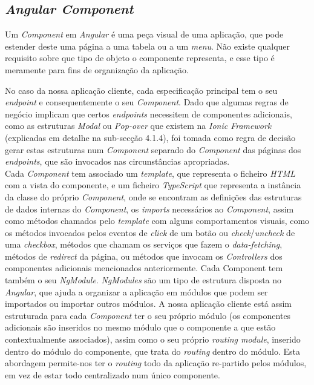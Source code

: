 \subsection{\textit{Angular Component}}\label{sub411}

Um \emph{Component} em \emph{Angular} é uma peça visual de uma aplicação, que pode estender deste uma página a uma tabela ou a um \textit{menu}. Não existe qualquer requisito sobre que tipo de objeto o componente representa, e esse tipo é meramente para fins de organização da aplicação. 

No caso da nossa aplicação cliente, cada especificação principal tem o seu \emph{endpoint} e consequentemente o seu \emph{Component}. Dado que algumas regras de negócio implicam que certos \emph{endpoints} necessitem de componentes adicionais, como as estruturas \emph{Modal} ou \emph{Pop-over} que existem na \emph{Ionic Framework} (explicadas em detalhe na sub-secção 4.1.4), foi tomada como regra de decisão gerar estas estruturas num \emph{Component} separado do \emph{Component} das páginas dos \emph{endpoints}, que são invocados nas circunstâncias apropriadas.\\
Cada \textit{Component} tem associado um \textit{template}, que representa o ficheiro \textit{HTML} com a vista do componente, e um ficheiro \textit{TypeScript} que representa a instância da classe do próprio \textit{Component}, onde se encontram as definições das estruturas de dados internas do \textit{Component}, os \textit{imports} necessários ao \textit{Component}, assim como métodos chamados pelo \textit{template} com alguns comportamentos visuais, como os métodos invocados pelos eventos de \textit{click} de um botão ou \textit{check}/\textit{uncheck} de uma \textit{checkbox}, métodos que chamam os serviços que fazem o \textit{data-fetching}, métodos de \textit{redirect} da página, ou métodos que invocam os \textit{Controllers} dos componentes adicionais mencionados anteriormente.
Cada Component tem também o seu \textit{NgModule}. \textit{NgModules} são um tipo de estrutura disposta no \textit{Angular}, que ajuda a organizar a aplicação em módulos que podem ser importados ou importar outros módulos. A nossa aplicação cliente está assim estruturada para cada \textit{Component} ter o seu próprio módulo (os componentes adicionais são inseridos no mesmo módulo que o componente a que estão contextualmente associados), assim como o seu próprio \textit{routing module}, inserido dentro do módulo do componente, que trata do \textit{routing} dentro do módulo. Esta abordagem permite-nos ter o \textit{routing} todo da aplicação re-partido pelos módulos, em vez de estar todo centralizado num único componente.

